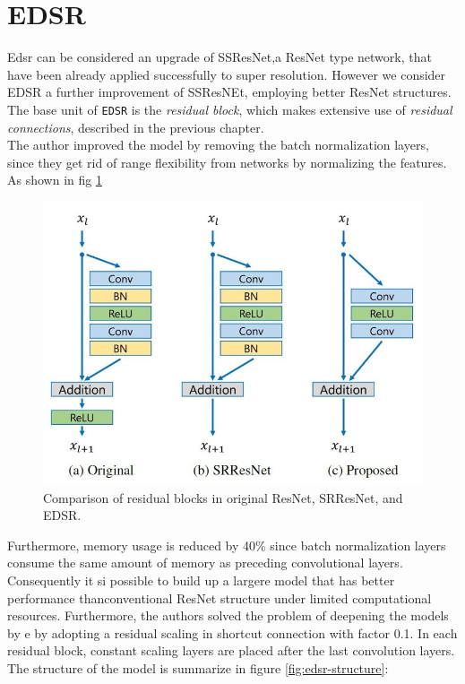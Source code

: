 \documentclass[a4paper, 10pt]{book}
\begin{document}
\section{EDSR}
Edsr can be considered an upgrade of SSResNet,a ResNet type network, that have been already  applied successfully to super resolution. However we consider EDSR a further improvement of SSResNEt, employing better ResNet structures. 
The base unit of {\tt EDSR} is the {\it residual block}, which makes extensive use of {\it residual connections}, described in the previous chapter.
\\
The author improved the model by removing the batch normalization layers, since they get rid of range flexibility from networks by normalizing the features. As shown in fig \ref{convnet}
\begin{figure}[H]
    \centering
    \includegraphics[scale=0.8]{ConvNEt.jpg}
    \caption{Comparison of residual blocks in original
ResNet, SRResNet, and EDSR.}
    \label{convnet}
\end{figure}
Furthermore, memory usage is reduced by 40\% since batch normalization layers consume the same amount of memory as preceding convolutional layers.
Consequently it si possible to build up a largere model that  has better performance thanconventional ResNet structure under limited computational
resources.
Furthermore, the authors solved the problem of deepening the models by e by adopting a residual scaling in shortcut connection with factor 0.1. In each residual block, constant scaling layers are placed after the last convolution layers. 
 \\
The structure of the model is summarize in figure \ref{fig:edsr-structure}:
\end{document}
